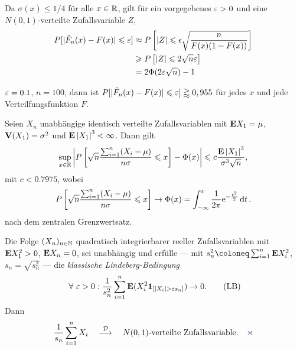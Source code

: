 \begin{bem}[Bemerkungen.]
\begin{bemenum}
Da $\sigma(x)\le1/4$  für alle $x\in\mathbb{R}$, gilt für ein vorgegebenes $\varepsilon>0$
und eine $N(0,1)$-verteilte Zufallsvariable $Z$,
\begin{align*}
P[|\hat{F}_n(x)-F(x)| \leqslant \varepsilon]
& \approx P\left[|Z| \leqslant \epsilon\sqrt{\frac{n}{F(x)(1-F(x))}}\right]\\
& \geqslant P\left[|Z| \leqslant 2 \sqrt{n} \varepsilon \right] \\
&= 2 \Phi(2\varepsilon\sqrt{n}) -1
\end{align*}
\begin{bspn}[Zahlenbeispiel]
$\varepsilon=0.1$, $n=100$, dann ist $P[|\hat{F}_n(x)-F(x)| \leqslant
\varepsilon] \gtrapprox 0,955 $ für jedes $x$ und jede Verteilfungsfunktion $F$.\bsphere
\end{bspn}
\item
\begin{propn}
Seien $X_n$ unabhängige identisch verteilte Zufallsvariablen mit $\textbf{E} X_1 =
\mu$, $\textbf{V}(X_1) = \sigma^2$ und $\textbf{E} \left|X_1\right|^3 < \infty$. Dann gilt
\begin{align*}
\sup_{x\in\mathbb{R}}\left|P\left[\sqrt{n}\frac{\sum_{i=1}^n (X_i-\mu)}{n\sigma} \leqslant x
\right] - \Phi(x)\right| \leqslant c \frac{\textbf{E} \left|X_1\right|^3}{\sigma^3\sqrt{n}},
\end{align*}
mit $c < 0.7975$, wobei
\begin{align*}
P\left[\sqrt{n}\frac{\sum_{i=1}^n (X_i-\mu)}{n\sigma} \leqslant x \right] \to
 \Phi(x) = \int_{-\infty}^x \frac{1}{2\pi} \mathrm{e}^{-\frac{t^2}{2}}\,\mathrm{d} t\,. 
\end{align*}
nach dem zentralen Grenzwertsatz.\fishhere\maphere
\end{propn}
\end{bemenum}
\end{bem}


\begin{prop}
\label{prop:9.12}
Die Folge $(X_{n})_{n\in \mathbb{N}}$ quadratisch integrierbarer reeller
Zufallsvariablen mit $\textbf{E} X^{2}_{1}>0$, $\textbf{E} X_{n}=0$, sei
unabhängig und erfülle --- mit $s^{2}_{n}\defl\sum^{n}_{i=1}\E X^{2}_{i}$, $s_n =
\sqrt{s^2_n}$ --- die \emph{klassische Lindeberg-Bedingung}
\begin{align*}
\forall {\varepsilon > 0} :
\frac{1}{s^ {2}_{n}}\sum^{n}_{i=1} \E(X^ {2}_{i}\Id_{ [|X_{i}| > \ep s_n]})\to
0.
\tag{LB}
\end{align*}
Dann
\begin{align*}
\frac{1}{s_{n}}\sum\limits^ {n}_{i=1}X_{i}\quad
\overset{\DD}{\longrightarrow}\quad N(0,1)\mbox{-verteilte
Zufallsvariable.}\fishhere
\end{align*}
\end{prop}

